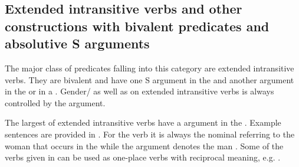 
\subsection{Extended intransitive verbs and other constructions with bivalent predicates and absolutive S arguments}
\label{sec:Extended intransitive verbs}
The major class of predicates falling into this category are extended intransitive verbs. They are bivalent and have one S argument in the  and another argument in the  or in a . Gender/ as well as  on extended intransitive verbs is always controlled by the  argument.

The largest  of extended intransitive verbs have a  argument in the  . Example sentences are provided in . For the verb   it is always the nominal referring to the woman that occurs in the  while the  argument denotes the man . Some of the verbs given in  can be used as one-place verbs with reciprocal meaning, e.g.  .

